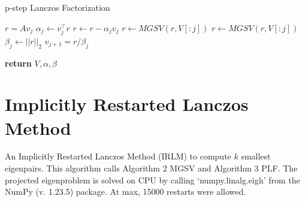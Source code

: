 \documentclass[a4paper]{article}
\begin{document}
\begin{algorithm}
\caption{p-step Lanczos Factorization}\label{alg:PLF}
\begin{algorithmic}[1]


    \State $r = Av_j$
    \State $\alpha_j \gets v_j^\top r  $
    \State $r \gets r - \alpha_j v_j $
    \State $r \gets MGSV(r,V[:j])$ 
    \State $r \gets MGSV(r,V[:j])$
    \State $\beta_j \gets ||r||_2  $
    \State $v_{j+1} = r / \beta_j$
\EndFor


\State \textbf{return} $V, \alpha, \beta$

\EndProcedure
\end{algorithmic}
\end{algorithm}



\pagebreak





\section{Implicitly Restarted Lanczos Method}
An Implicitly Restarted Lanczos Method (IRLM) to compute $k$ smallest eigenpairs. This algorithm calls Algorithm 2 MGSV and Algorithm 3 PLF. The projected eigenproblem is solved on CPU by calling ‘numpy.linalg.eigh’ from the NumPy (v. 1.23.5) package. At max, 15000 restarts were allowed.
\end{document}
